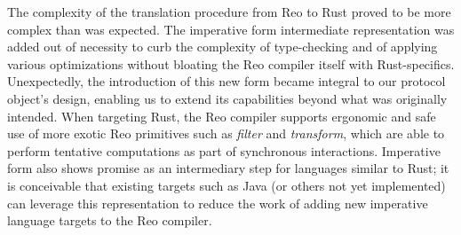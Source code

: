 The complexity of the translation procedure from Reo to Rust
proved to be more complex than was expected. The imperative form intermediate representation was added out of necessity to curb the complexity of type-checking and of applying various optimizations without bloating the Reo compiler itself with Rust-specifics. Unexpectedly, the introduction of this new form became integral to our protocol object's design, enabling us to extend its capabilities beyond what was originally intended. When targeting Rust, the Reo compiler supports ergonomic and safe use of more exotic Reo primitives such as \textit{filter} and \textit{transform}, which are able to perform tentative computations as part of synchronous interactions. Imperative form also shows promise as an intermediary step for languages similar to Rust; it is conceivable that existing targets such as Java (or others not yet implemented) can leverage this representation to reduce the work of adding new imperative language targets to the Reo compiler. 

